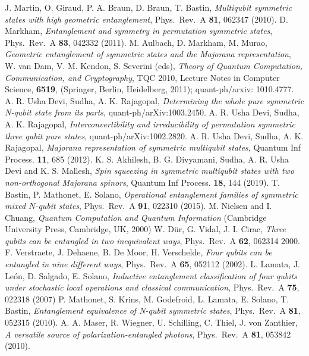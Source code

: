 \begin{thebibliography}{99}
 J. Martin, O. Giraud, P. A. Braun, D. Braun, T. Bastin, {\em Multiqubit symmetric states with high geometric entanglement}, Phys.\ Rev.\ A {\bf 81}, 062347 (2010).
 D. Markham, {\em Entanglement and symmetry in permutation symmetric states}, Phys.\ Rev.\ A  {\bf 83}, 042332 (2011).
 M. Aulbach,  D. Markham, M. Murao, {\em Geometric entanglement of symmetric states and the Majorana representation}, W. van Dam, V. M. Kendon, S. Severini (eds), {\em Theory of Quantum Computation, Communication, and Cryptography}, TQC 2010, Lecture Notes in Computer Science, {\bf 6519}, (Springer, Berlin, Heidelberg, 2011); quant-ph/arxiv: 1010.4777.
 A. R. Usha Devi,  Sudha, A. K. Rajagopal, {\em Determining the whole pure symmetric N-qubit state from its parts},  quant-ph/arXiv:1003.2450.
 A. R. Usha Devi,  Sudha, A. K. Rajagopal, {\em Interconvertibility and irreducibility of permutation symmetric three qubit pure states},
quant-ph/arXiv:1002.2820. 
 A. R. Usha Devi,  Sudha, A. K. Rajagopal, {\em  Majorana representation of symmetric multiqubit states}, Quantum Inf Process. {\bf 11}, 685 (2012).
 K. S. Akhilesh, B. G. Divyamani, Sudha, A. R. Usha Devi and K. S. Mallesh, {\em Spin squeezing in symmetric multiqubit states with two non-orthogonal Majorana spinors}, Quantum Inf Process. {\bf 18}, 144 (2019).  
 T. Bastin, P. Mathonet, E. Solano, {\em Operational entanglement families of symmetric mixed $N$-qubit states}, Phys.\ Rev.\ A {\bf 91}, 022310 (2015).
 M. Nielsen and I. Chuang, {\em Quantum Computation and Quantum Information} (Cambridge University Press, Cambridge, UK, 2000)
 W. D{\"u}r,  G. Vidal, J. I. Cirac, {\em Three qubits can be entangled in two inequivalent ways}, Phys.\ Rev.\ A {\bf 62}, 062314 2000.
 F. Verstraete, J.  Dehaene, B. De Moor, H. Verschelde, {\em Four qubits can be entangled in nine different ways}, Phys.\ Rev.\ A  {\bf 65}, 052112  (2002).
 L. Lamata, J. Le{\'o}n, D. Salgado, E. Solano, {\em Inductive entanglement classification of four qubits under stochastic local operations and classical communication}, Phys.\ Rev.\ A {\bf 75}, 022318 (2007)
 P. Mathonet, S. Krins, M. Godefroid, L. Lamata, E. Solano, T. Bastin, {\em Entanglement equivalence of N-qubit symmetric states},  Phys.\  Rev.\ A {\bf 81}, 052315  (2010).
  A. A. Maser, R. Wiegner, U. Schilling, C. Thiel, J. von Zanthier, {\em A versatile source of polarization-entangled photons},  Phys.\ Rev.\ A {\bf 81}, 053842 (2010).

\end{thebibliography}
